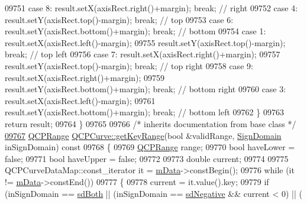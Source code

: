 \begin{DoxyCode}
09751     \textcolor{keywordflow}{case} 8: result.setX(axisRect.right()+margin); \textcolor{keywordflow}{break}; \textcolor{comment}{// right}
09752     \textcolor{keywordflow}{case} 4: result.setY(axisRect.top()-margin); \textcolor{keywordflow}{break}; \textcolor{comment}{// top}
09753     \textcolor{keywordflow}{case} 6: result.setY(axisRect.bottom()+margin); \textcolor{keywordflow}{break}; \textcolor{comment}{// bottom}
09754     \textcolor{keywordflow}{case} 1: result.setX(axisRect.left()-margin);
09755             result.setY(axisRect.top()-margin); \textcolor{keywordflow}{break}; \textcolor{comment}{// top left}
09756     \textcolor{keywordflow}{case} 7: result.setX(axisRect.right()+margin);
09757             result.setY(axisRect.top()-margin); \textcolor{keywordflow}{break}; \textcolor{comment}{// top right}
09758     \textcolor{keywordflow}{case} 9: result.setX(axisRect.right()+margin);
09759             result.setY(axisRect.bottom()+margin); \textcolor{keywordflow}{break}; \textcolor{comment}{// bottom right}
09760     \textcolor{keywordflow}{case} 3: result.setX(axisRect.left()-margin);
09761             result.setY(axisRect.bottom()+margin); \textcolor{keywordflow}{break}; \textcolor{comment}{// bottom left}
09762   \}
09763   \textcolor{keywordflow}{return} result;
09764 \}
09765 
09766 \textcolor{comment}{/* inherits documentation from base class */}
\hypertarget{a00115_source_l09767}{}\hyperlink{a00028_aed062a72e98372480a683cdd201b5612}{09767} \hyperlink{a00049}{QCPRange} \hyperlink{a00028_aed062a72e98372480a683cdd201b5612}{QCPCurve::getKeyRange}(\textcolor{keywordtype}{bool} &validRange, 
      \hyperlink{a00024_a661743478a1d3c09d28ec2711d7653d8}{SignDomain} inSignDomain)\textcolor{keyword}{ const}
09768 \textcolor{keyword}{}\{
09769   \hyperlink{a00049}{QCPRange} range;
09770   \textcolor{keywordtype}{bool} haveLower = \textcolor{keyword}{false};
09771   \textcolor{keywordtype}{bool} haveUpper = \textcolor{keyword}{false};
09772   
09773   \textcolor{keywordtype}{double} current;
09774   
09775   QCPCurveDataMap::const\_iterator it = \hyperlink{a00028_a88d533e455bca96004b049e99168731b}{mData}->constBegin();
09776   \textcolor{keywordflow}{while} (it != \hyperlink{a00028_a88d533e455bca96004b049e99168731b}{mData}->constEnd())
09777   \{
09778     current = it.value().key;
09779     \textcolor{keywordflow}{if} (inSignDomain == \hyperlink{a00024_a661743478a1d3c09d28ec2711d7653d8a082b98cfb91a7363a3b5cd17b0c1cd60}{sdBoth} || (inSignDomain == \hyperlink{a00024_a661743478a1d3c09d28ec2711d7653d8a0fc9a70796ef60ad18ddd18056e6dc63}{sdNegative} && current < 0) || (

\end{DoxyCode}

